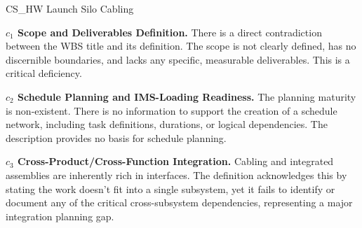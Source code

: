 %
\begin{frame}{CS\_HW Launch Silo Cabling}
\begin{minipage}{0.90\textwidth}
\raggedright
\fontsize{8}{9.5}\selectfont
\textbf{\(c_1\) Scope and Deliverables Definition.}
There is a direct contradiction between the WBS title and its definition. The scope is not clearly defined, has no discernible boundaries, and lacks any specific, measurable deliverables. This is a critical deficiency.\par\vspace{0.6em}
\textbf{\(c_2\) Schedule Planning and IMS-Loading Readiness.}
The planning maturity is non-existent. There is no information to support the creation of a schedule network, including task definitions, durations, or logical dependencies. The description provides no basis for schedule planning.\par\vspace{0.6em}
\textbf{\(c_3\) Cross-Product/Cross-Function Integration.}
Cabling and integrated assemblies are inherently rich in interfaces. The definition acknowledges this by stating the work doesn't fit into a single subsystem, yet it fails to identify or document any of the critical cross-subsystem dependencies, representing a major integration planning gap.\par\vspace{0.6em}
\end{minipage}
\end{frame}

\endinput

